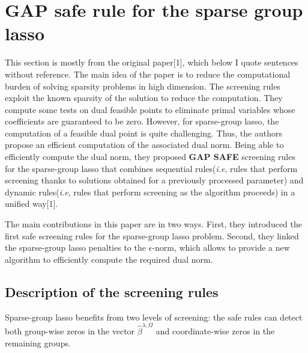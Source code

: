 \documentclass{article}
\begin{document}
\section{GAP safe rule for the sparse group lasso}

This section is mostly from the original paper[1], which below I quote sentences without reference. 
The main idea of the paper is to reduce the computational burden of solving sparsity problems in high dimension. The screening rules exploit the known sparsity of the solution to reduce the computation. They compute some tests on dual feasible points to eliminate primal variables whose coefficients are guaranteed to be zero. However, for sparse-group lasso, the computation of a feasible dual point is quite challenging. Thus, the authors propose an efficient computation of the associated dual norm.  Being able to efficiently compute the dual norm, they proposed \textbf{GAP SAFE} screening rules for the sparse-group lasso that combines sequential rules(\textit{i.e}, rules that perform screening thanks to solutions obtained for a previously processed parameter) and dynamic rules(\textit{i.e}, rules that perform screening as the algorithm proceeds) in a unified way[1]. 

The main contributions in this paper are in two ways.  First, they introduced the first safe screening rules for the sparse-group lasso problem. Second, they linked the sparse-group lasso penalties to the $\epsilon$-norm, which allows to provide a new algorithm to efficiently compute the required dual norm.

\subsection{Description of the screening rules}
Sparse-group lasso benefits from two levels of screening: the safe rules can detect both group-wise zeros in the vector $\hat{\beta}^{\lambda,\Omega}$ and coordinate-wise zeros in the remaining groups. 
\end{document}
